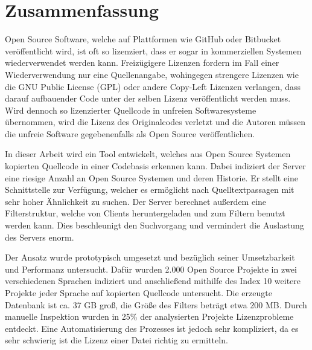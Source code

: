 \chapter{Zusammenfassung}
Open Source Software, welche auf Plattformen wie GitHub oder Bitbucket veröffentlicht wird, ist oft so lizenziert, dass er sogar in kommerziellen Systemen wiederverwendet werden kann.
Freizügigere Lizenzen fordern im Fall einer Wiederverwendung nur eine Quellenangabe, wohingegen strengere Lizenzen wie die GNU Public License (GPL) oder andere Copy-Left Lizenzen verlangen, dass darauf aufbauender Code unter der selben Lizenz veröffentlicht werden muss.
Wird dennoch so lizenzierter Quellcode in unfreien Softwaresysteme übernommen, wird die Lizenz des Originalcodes verletzt und die Autoren müssen die unfreie Software gegebenenfalls als Open Source veröffentlichen.

In dieser Arbeit wird ein Tool entwickelt, welches aus Open Source Systemen kopierten Quellcode in einer Codebasis erkennen kann.
Dabei indiziert der Server eine riesige Anzahl an Open Source Systemen und deren Historie.
Er stellt eine Schnittstelle zur Verfügung, welcher es ermöglicht nach Quelltextpassagen mit sehr hoher Ähnlichkeit zu suchen.
Der Server berechnet außerdem eine Filterstruktur, welche von Clients heruntergeladen und zum Filtern benutzt werden kann.
Dies beschleunigt den Suchvorgang und vermindert die Auslastung des Servers enorm.

Der Ansatz wurde prototypisch umgesetzt und bezüglich seiner Umsetzbarkeit und Performanz untersucht.
Dafür wurden 2.000 Open Source Projekte in zwei verschiedenen Sprachen indiziert und anschließend mithilfe des Index 10 weitere Projekte jeder Sprache auf kopierten Quellcode untersucht.
Die erzeugte Datenbank ist ca. 37 GB groß, die Größe des Filters beträgt etwa 200 MB.
Durch manuelle Inspektion wurden in 25\% der analysierten Projekte Lizenzprobleme entdeckt.
Eine Automatisierung des Prozesses ist jedoch sehr kompliziert, da es sehr schwierig ist die Lizenz einer Datei richtig zu ermitteln.